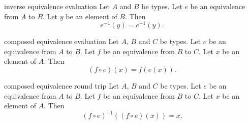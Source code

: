 \begin{cleanresult}{inverse equivalence evaluation}
Let $A$ and $B$ be types.
Let $e$ be an equivalence from $A$ to $B$.
Let $y$ be an element of $B$.
Then \[e^{-1}(y) = e^{-1}(y).\]
\par{}
\end{cleanresult}

\begin{cleanresult}{composed equivalence evaluation}
Let $A$, $B$ and $C$ be types.
Let $e$ be an equivalence from $A$ to $B$.
Let $f$ be an equivalence from $B$ to $C$.
Let $x$ be an element of $A$.
Then \[\left(f\circ e\right)(x) = f(e(x)).\]
\par{}
\end{cleanresult}

\begin{cleanresult}{composed equivalence round trip}
Let $A$, $B$ and $C$ be types.
Let $e$ be an equivalence from $A$ to $B$.
Let $f$ be an equivalence from $B$ to $C$.
Let $x$ be an element of $A$.
Then \[\left(f\circ e\right)^{-1}(\left(f\circ e\right)(x)) = x.\]
\par{}
\end{cleanresult}

